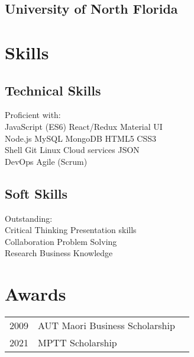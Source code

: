 \documentclass[]{deedy-resume-openfont}
\begin{document}
\begin{minipage}[t]{3.2in}
\subsection{University of North Florida}
\sectionsep


\section{Skills}
\subsection{Technical Skills}
Proficient with: \\
JavaScript (ES6) \textbullet{} React/Redux \textbullet{} Material UI \\  Node.js \textbullet{} MySQL \textbullet{} MongoDB \textbullet{} HTML5 \textbullet{} CSS3 \\
Shell \textbullet{} Git \textbullet{} Linux \textbullet{} Cloud services \textbullet JSON \\ 
DevOps \textbullet Agile (Scrum) 
\sectionsep

\subsection{Soft Skills}
Outstanding: \\
Critical Thinking \textbullet{} Presentation skills \\
Collaboration\textbullet{} Problem Solving   \\
Research \textbullet{} Business Knowledge  \\
\sectionsep


\section{Awards} 
\begin{tabular}{rll}
2009	     & AUT Maori Business Scholarship  \\
2021	     & MPTT Scholarship  \\

\end{tabular}
\sectionsep
%
%

\end{minipage} 
\end{document}
